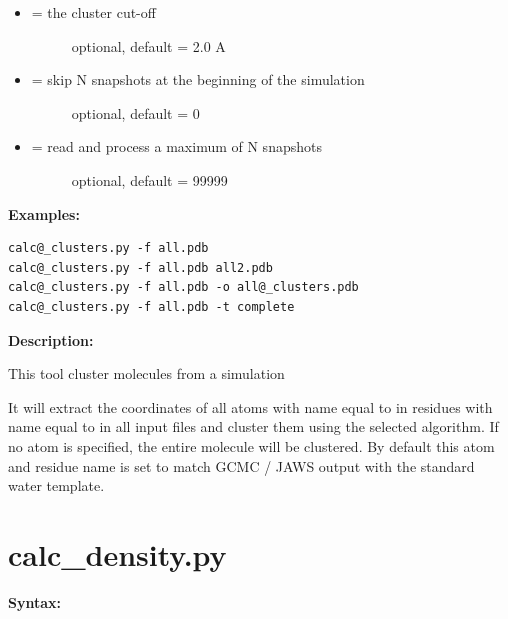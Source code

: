 \documentclass[letterpaper,10pt,english]{manual}
\begin{document}
\begin{itemize}
\begin{description}
\end{description}

\item {} \begin{description}
\item[{ = the cluster cut-off}] \leavevmode
optional, default = 2.0 A

\end{description}

\item {} \begin{description}
\item[{ = skip N snapshots at the beginning of the simulation}] \leavevmode
optional, default = 0

\end{description}

\item {} \begin{description}
\item[{ = read and process a maximum of N snapshots}] \leavevmode
optional, default = 99999

\end{description}

\end{itemize}

\textbf{Examples:}

\begin{Verbatim}[commandchars=@\[\]]
calc@_clusters.py -f all.pdb
calc@_clusters.py -f all.pdb all2.pdb
calc@_clusters.py -f all.pdb -o all@_clusters.pdb
calc@_clusters.py -f all.pdb -t complete
\end{Verbatim}

\textbf{Description:}

This tool cluster molecules from a simulation

It will extract the coordinates of all atoms with name equal to  in residues with name equal to  in all input files and cluster them using the selected algorithm.  If no atom is specified, the entire molecule will be clustered. By default this atom and residue name is set to match GCMC / JAWS output with the standard water template.


\section{calc\_density.py}

\textbf{Syntax:}
\end{document}
